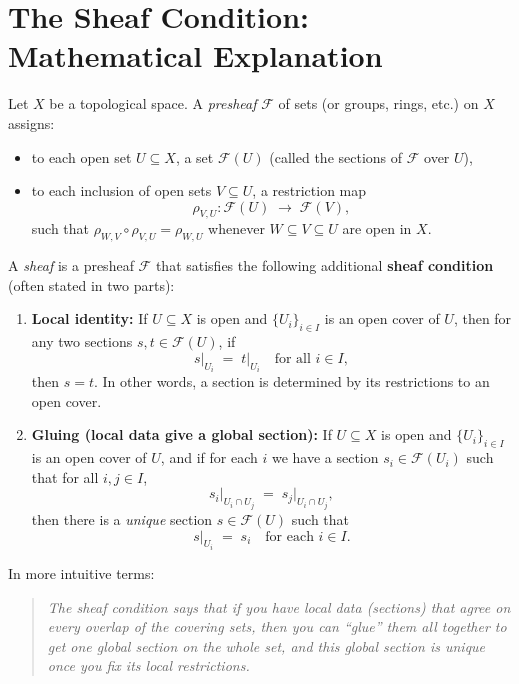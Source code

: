 \documentclass{article}
\begin{document}
\section*{The Sheaf Condition: Mathematical Explanation}

Let $X$ be a topological space. A \emph{presheaf} $\mathcal{F}$ of sets (or groups, rings, etc.) on $X$ assigns:
\begin{itemize}
\item to each open set $U \subseteq X$, a set $\mathcal{F}(U)$ (called the sections of $\mathcal{F}$ over $U$),
\item to each inclusion of open sets $V \subseteq U$, a restriction map
\[
\rho_{V,U} : \mathcal{F}(U) \; \longrightarrow \; \mathcal{F}(V),
\]
such that $\rho_{W,V} \circ \rho_{V,U} = \rho_{W,U}$ whenever $W \subseteq V \subseteq U$ are open in $X$.
\end{itemize}

\medskip

A \emph{sheaf} is a presheaf $\mathcal{F}$ that satisfies the following additional \textbf{sheaf condition} (often stated in two parts):

\begin{enumerate}
\item \textbf{Local identity:} If $U \subseteq X$ is open and $\{U_i\}_{i \in I}$ is an open cover of $U$, then for any two sections $s,t \in \mathcal{F}(U)$, if 
\[
s \big|_{U_i} \;=\; t \big|_{U_i} 
\quad\text{for all } i \in I,
\]
then $s = t$. In other words, a section is determined by its restrictions to an open cover.

\item \textbf{Gluing (local data give a global section):} If $U \subseteq X$ is open and $\{U_i\}_{i \in I}$ is an open cover of $U$, and if for each $i$ we have a section $s_i \in \mathcal{F}(U_i)$ such that for all $i,j \in I$,
\[
s_i \big|_{U_i \cap U_j} 
\;=\; 
s_j \big|_{U_i \cap U_j},
\]
then there is a \emph{unique} section $s \in \mathcal{F}(U)$ such that 
\[
s\big|_{U_i} \;=\; s_i
\quad\text{for each } i \in I.
\]
\end{enumerate}

\medskip

In more intuitive terms: 
\begin{quote}
\textit{The sheaf condition says that if you have local data (sections) that agree on every overlap of the covering sets, then you can ``glue'' them all together to get one global section on the whole set, and this global section is unique once you fix its local restrictions.}
\end{quote}
\end{document}
